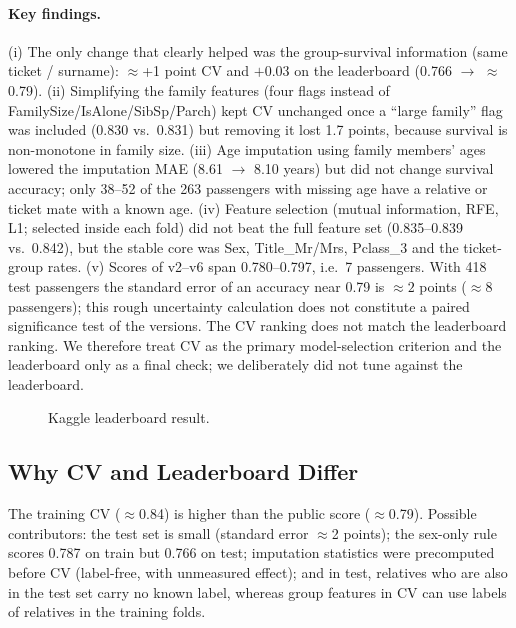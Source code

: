 \documentclass[10pt,twocolumn]{article}
\begin{document}
\paragraph{Key findings.}
(i) The only change that clearly helped was the group-survival information (same ticket / surname): $\approx$+1 point CV and $+0.03$ on the leaderboard (0.766 $\to$ $\approx$0.79).
(ii) Simplifying the family features (four flags instead of FamilySize/IsAlone/SibSp/Parch) kept CV unchanged once a ``large family'' flag was included (0.830 vs.\ 0.831) but removing it lost 1.7 points, because survival is non-monotone in family size.
(iii) Age imputation using family members' ages lowered the imputation MAE (8.61 $\to$ 8.10 years) but did not change survival accuracy; only 38--52 of the 263 passengers with missing age have a relative or ticket mate with a known age.
(iv) Feature selection (mutual information, RFE, L1; selected inside each fold) did not beat the full feature set (0.835--0.839 vs.\ 0.842), but the stable core was Sex, Title\_Mr/Mrs, Pclass\_3 and the ticket-group rates.
(v) Scores of v2--v6 span 0.780--0.797, i.e.\ 7 passengers. With 418 test passengers the standard error of an accuracy near 0.79 is $\approx 2$ points ($\approx 8$ passengers); this rough uncertainty calculation does not constitute a paired significance test of the versions. The CV ranking does not match the leaderboard ranking. We therefore treat CV as the primary model-selection criterion and the leaderboard only as a final check; we deliberately did not tune against the leaderboard.
\begin{figure}[t]\centering
  \caption{Kaggle leaderboard result.}
\end{figure}

\subsection{Why CV and Leaderboard Differ}
The training CV ($\approx$0.84) is higher than the public score ($\approx$0.79). Possible contributors: the test set is small (standard error $\approx$2 points); the sex-only rule scores 0.787 on train but 0.766 on test; imputation statistics were precomputed before CV (label-free, with unmeasured effect); and in test, relatives who are also in the test set carry no known label, whereas group features in CV can use labels of relatives in the training folds.
\end{document}
